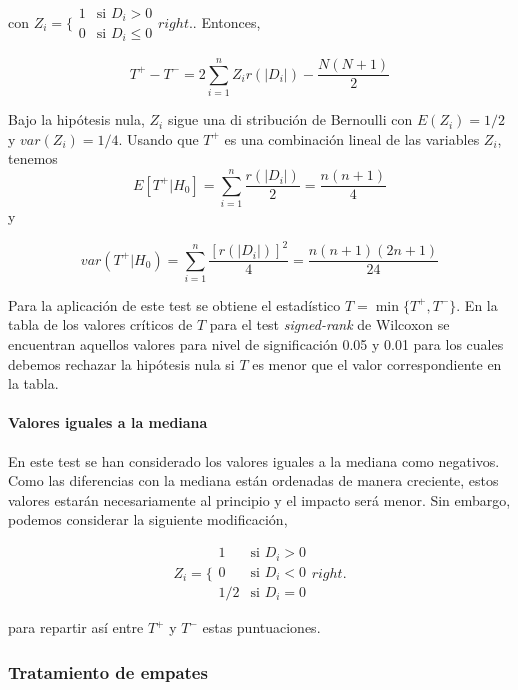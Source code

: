 	 con $ Z_i = \lbrace \begin{array}{ll}
	 				1 & \text{si } D_i > 0 \\
	 				0 & \text{si } D_i \leq 0
	 		\end{array}right.$. Entonces,
	 		
	\[ T^+  - T^- = 2 \sum\limits_{i=1}^n
					 Z_i r(|D_i|) - \frac{N(N+1)}{2} \]
	
	Bajo la hipótesis nula, $Z_i$ sigue una di stribución de Bernoulli con $E(Z_i) = 1/2$ y $var(Z_i) = 1/4$. Usando que $T^+$ es una combinación lineal de las variables $Z_i$, tenemos
	\[ E[ T^+ | H_0 ] = \sum\limits_{i=1}^n 
						\frac{r(|D_i|)}{2} 
					= \frac{n(n+1)}{4}			\]
	y
	
	\[ var( T^+ | H_0 ) = \sum\limits_{i=1}^n 
						\frac{[r(|D_i|)]^2}{4} 
					= \frac{n(n+1)(2n+1)}{24}	\]
					
	Para la aplicación de este test se obtiene el estadístico $T = \min \{ T^+, T^- \}$. En la tabla de los valores críticos de $T$ para el test \textit{signed-rank} de Wilcoxon \cite[Tabla A5]{SHESKIN11} se encuentran aquellos valores para nivel de significación 0.05 y 0.01 para los cuales debemos rechazar la hipótesis nula si $T$ es menor que el valor correspondiente en la tabla.\\
	
\paragraph{Valores iguales a la mediana} En este test se han considerado los valores iguales a la mediana como negativos. Como las diferencias con la mediana están ordenadas de manera creciente, estos valores estarán necesariamente al principio y el impacto será menor. Sin embargo, podemos considerar la siguiente modificación,

	\[ Z_i = \lbrace \begin{array}{ll}
	 				1 & \text{si } D_i > 0 \\
	 				0 & \text{si } D_i < 0 \\
	 				1/2 & \text{si } D_i = 0 
	 		\end{array}right. 					\]
	
	para repartir así entre $T^+$ y $T^-$ estas puntuaciones. 
	
\subsubsection{Tratamiento de empates}
	
